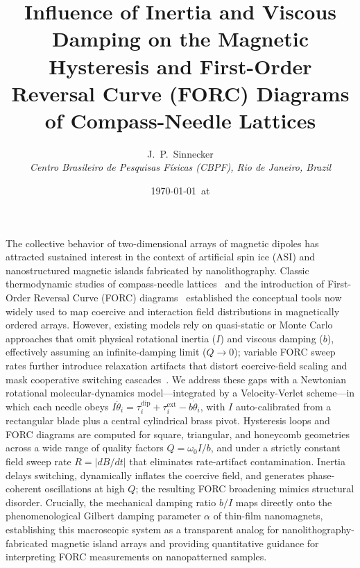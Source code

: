 \documentclass[12pt,a4paper]{article}
\title{Influence of Inertia and Viscous Damping on the Magnetic Hysteresis
and First-Order Reversal Curve (FORC) Diagrams of Compass-Needle Lattices}
\author{J.~P.~Sinnecker\\[1pt]
\normalfont\small\itshape
Centro Brasileiro de Pesquisas F\'isicas (CBPF), Rio de Janeiro, Brazil}
\date{\today\ at \compileTime}
\begin{document}
\maketitle
\thispagestyle{empty}

\noindent
The collective behavior of two-dimensional arrays of magnetic dipoles has attracted
sustained interest in the context of artificial spin ice (ASI) and nanostructured
magnetic islands fabricated by nanolithography.
Classic thermodynamic studies of compass-needle lattices~\cite{prb1998} and the
introduction of First-Order Reversal Curve (FORC) diagrams~\cite{roberts2000}
established the conceptual tools now widely used to map coercive and interaction
field distributions in magnetically ordered arrays.
However, existing models rely on quasi-static or Monte Carlo approaches that omit
physical rotational inertia ($I$) and viscous damping ($b$), effectively assuming
an infinite-damping limit ($Q\!\to\!0$); variable FORC sweep rates further introduce
relaxation artifacts that distort coercive-field scaling and mask cooperative switching
cascades~\cite{ruta2017}.
We address these gaps with a Newtonian rotational molecular-dynamics model---integrated
by a Velocity-Verlet scheme---in which each needle obeys
$I\ddot{\theta}_{i} = \tau_{i}^{\text{dip}} + \tau_{i}^{\text{ext}} - b\dot{\theta}_{i}$,
with $I$ auto-calibrated from a rectangular blade plus a central cylindrical brass pivot.
Hysteresis loops and FORC diagrams are computed for square, triangular, and honeycomb
geometries across a wide range of quality factors $Q=\omega_{0}I/b$, and under a
strictly constant field sweep rate $R=|dB/dt|$ that eliminates rate-artifact
contamination.
Inertia delays switching, dynamically inflates the coercive field, and generates
phase-coherent oscillations at high $Q$; the resulting FORC broadening mimics
structural disorder.
Crucially, the mechanical damping ratio $b/I$ maps directly onto the phenomenological
Gilbert damping parameter $\alpha$ of thin-film nanomagnets, establishing this
macroscopic system as a transparent analog for nanolithography-fabricated magnetic
island arrays and providing quantitative guidance for interpreting FORC measurements
on nanopatterned samples.
\end{document}
